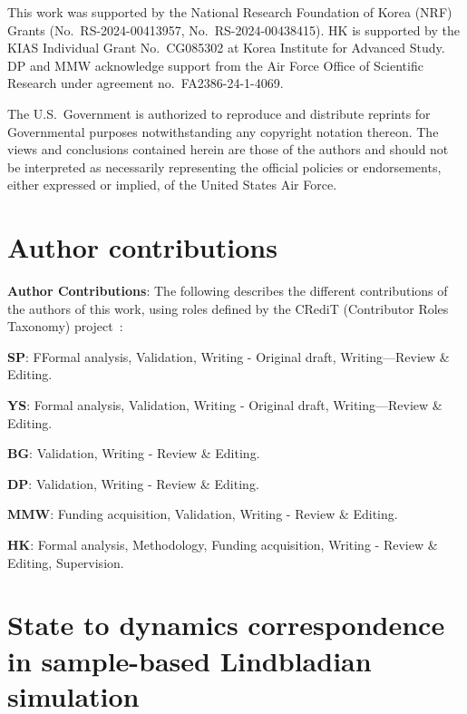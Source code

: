 \documentclass[superscriptaddress,amsmath,amssymb,aps,pra,letterpaper,tightenlines,notitlepages,12pt]{revtex4-2}
\begin{document}
\begin{acknowledgments}
This work was supported by the National Research Foundation of Korea (NRF) Grants (No.~RS-2024-00413957, No.~RS-2024-00438415). HK is supported by the KIAS Individual Grant No.~CG085302 at Korea Institute for Advanced Study. DP and MMW acknowledge support from the Air Force Office of Scientific Research under agreement no.~FA2386-24-1-4069.    
    
The U.S.~Government is authorized to reproduce and distribute reprints for Governmental purposes notwithstanding any copyright notation thereon. The views and conclusions contained herein are those of the authors and should not be interpreted as necessarily representing the official policies or endorsements, either expressed or implied, of the United States Air Force.

    
\end{acknowledgments}

\section*{Author contributions}

\noindent \textbf{Author Contributions}:
The following describes the different contributions of the authors of this work, using roles defined by the CRediT
(Contributor Roles Taxonomy) project~\cite{NISO}:

\medskip 
\noindent \textbf{SP}: FFormal analysis, Validation, Writing - Original draft, Writing—Review \& Editing.

\medskip 
\noindent \textbf{YS}: Formal analysis, Validation, Writing - Original draft, Writing—Review \& Editing.

\medskip 
\noindent \textbf{BG}: Validation, Writing - Review \& Editing.

\medskip 
\noindent \textbf{DP}: Validation, Writing - Review \& Editing.

\medskip 
\noindent \textbf{MMW}: Funding acquisition,  Validation,  Writing - Review \& Editing.

\medskip 
\noindent \textbf{HK}: Formal analysis, Methodology, Funding acquisition, Writing - Review \& Editing, Supervision.



\appendix

\section{State to dynamics correspondence in sample-based Lindbladian simulation}
\end{document}
